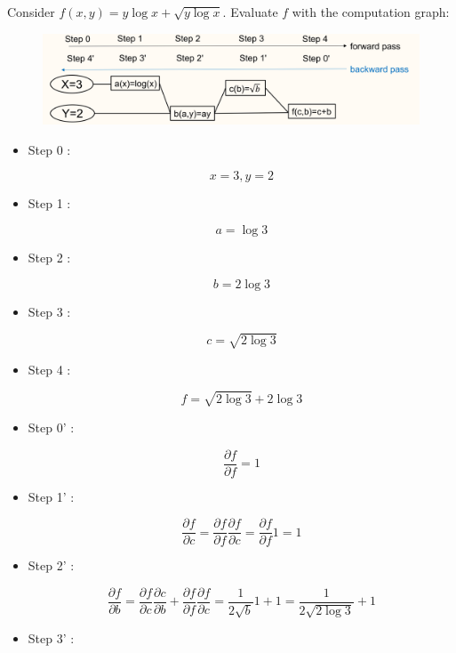 \documentclass{report}
\begin{document}
\begin{example}
    Consider $f(x, y)=y \log x+\sqrt{y \log x}$. Evaluate $f$ with the computation graph:

    \begin{figure}[H]
        \centering
        \includegraphics[width=1.0\textwidth]{.././assets/6.12.png}
    \end{figure}

    \begin{itemize}
        \item
        Step 0 :

        $$
        x=3, y=2
        $$
        \item
        Step 1 :

        $$
        a=\log 3
        $$
        \item
        Step 2 :

        $$
        b=2 \log 3
        $$
        \item
        Step 3 :

        $$
        c=\sqrt{2 \log 3}
        $$
        \item
        Step 4 :

        $$
        f=\sqrt{2 \log 3}+2 \log 3
        $$
    \end{itemize}

    \par\noindent\textcolor{gray}{\hdashrule{\textwidth}{0.4pt}{1pt 2pt}}

    \begin{itemize}
        \item
        Step 0' :

        $$
        \frac{\partial f}{\partial f}=1
        $$
        \item
        Step 1' :

        $$
        \frac{\partial f}{\partial c}=\frac{\partial f}{\partial f} \frac{\partial f}{\partial c}=\frac{\partial f}{\partial f} 1=1
        $$
        \item
        Step 2' :

        $$
        \frac{\partial f}{\partial b}=\frac{\partial f}{\partial c} \frac{\partial c}{\partial b}+\frac{\partial f}{\partial f} \frac{\partial f}{\partial c}=\frac{1}{2 \sqrt{b}} 1+1=\frac{1}{2 \sqrt{2 \log 3}}+1
        $$
        \item
        Step 3' :


\end{itemize}
\end{example}
\end{document}
